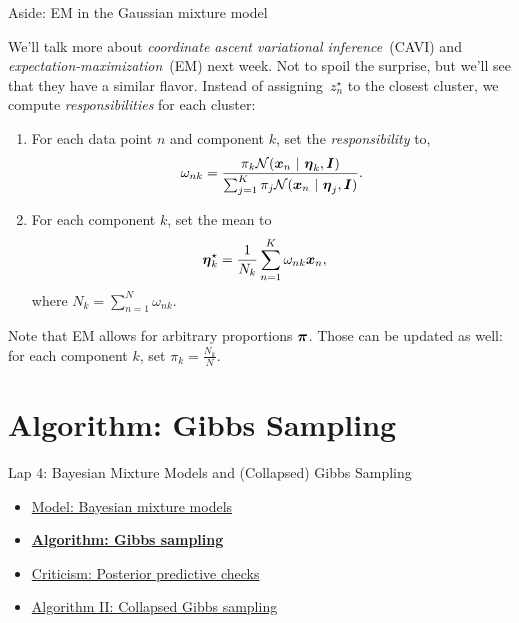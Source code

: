 \documentclass[aspectratio=169]{beamer}
\begin{document}
\begin{frame}{Aside: EM in the Gaussian mixture model}

We'll talk more about \textit{coordinate ascent variational inference}~(CAVI) and \textit{expectation-maximization}~(EM) next week. Not to spoil the surprise, but we'll see that they have a similar flavor. Instead of assigning~$z_n^\star$ to the closest cluster, we compute \textit{responsibilities} for each cluster:
\begin{enumerate}
    \item For each data point $n$ and component $k$, set the \textit{responsibility} to,
    \begin{align}
        \omega_{nk} = \frac{\pi_k \mathcal{N}(\boldsymbol{x}_n ~\vert~ \boldsymbol{\eta}_k, \boldsymbol{I})}{\sum_{j=1}^K \pi_j \mathcal{N}(\boldsymbol{x}_n ~\vert~ \boldsymbol{\eta}_j, \boldsymbol{I})}.
    \end{align}
    
    \item For each component $k$, set the mean to
    \begin{align}
        \boldsymbol{\eta}_k^\star &= \frac{1}{N_k} \sum_{n=1}^K \omega_{nk} \boldsymbol{x}_n,
    \end{align}
    where $N_k = \sum_{n=1}^N \omega_{nk}$.
\end{enumerate}

Note that EM allows for arbitrary proportions $\boldsymbol{\pi}$. Those can be updated as well: for each component $k$, set $\pi_k = \frac{N_k}{N}$.

\end{frame}

\section{Algorithm: Gibbs Sampling}
\label{sec:gibbs}


\begin{frame}{Lap 4: Bayesian Mixture Models and (Collapsed) Gibbs Sampling}
\begin{itemize}
    \item \hyperref[sec:mixtures]{Model: Bayesian mixture models}
    \item \hyperref[sec:gibbs]{\textbf{Algorithm: Gibbs sampling}}
    \item \hyperref[sec:ppcs]{Criticism: Posterior predictive checks}
    \item \hyperref[sec:collapsed_gibbs]{Algorithm II: Collapsed Gibbs sampling}
\end{itemize}
\end{frame}
\end{document}
